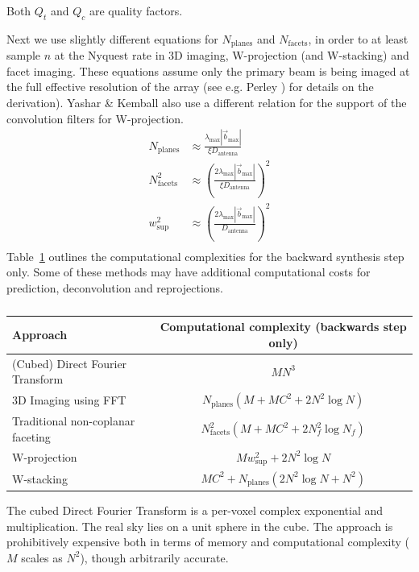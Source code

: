 Both $Q_t$ and $Q_c$ are quality factors.

Next we use slightly different equations for $N_\text{planes}$ and $N_\text{facets}$, in order to at least sample $n$ at the Nyquest rate in 3D imaging, W-projection (and W-stacking) and facet imaging. 
These equations assume only the primary beam is being imaged at the full effective resolution of the array (see e.g. Perley \cite[Lecture 19]{taylor1999synthesis}) for details on the derivation). 
Yashar \& Kemball \cite{yashar2009tdp} also use a different relation for the support of the convolution filters for W-projection.
\begin{equation}
 \begin{split}
  N_\text{planes} &\approx \frac{\lambda_{\text{max}}|\vec{b}_{\text{max}}|}{\xi D_{\text{antenna}}}\\
  N_\text{facets}^2 &\approx \left(\frac{2\lambda_{\text{max}}|\vec{b}_{\text{max}}|}{\xi D_{\text{antenna}}}\right)^2\\
  w_\text{sup}^2 &\approx \left(\frac{2\lambda_{\text{max}}|\vec{b}_{\text{max}}|}{D_{\text{antenna}}}\right)^2\\
 \end{split}
\end{equation}
Table~\ref{tbl_computational complexities} outlines the computational complexities for the backward synthesis step only. Some of these methods may have additional computational costs for prediction, deconvolution and reprojections.
\begin{table}[ht]
  \centering
  \begin{tabular}[c]{|p{7cm}|c|}
  \hline
  \textbf{Approach} & \textbf{Computational complexity (backwards step only)}\\
  \hline
  (Cubed) Direct Fourier Transform & $MN^3$\\
  \hline
  3D Imaging using FFT &$N_\text{planes}(M + MC^2 + 2N^2\log{N})$\\
  \hline
  Traditional non-coplanar faceting & $N_\text{facets}^2(M + MC^2 + 2N_f^2\log{N_f})$\\
  \hline
  W-projection & $Mw_\text{sup}^2+2N^2\log{N}$\\
  \hline
  W-stacking & $MC^2 + N_\text{planes}(2N^2\log{N} + N^2)$\\
  \hline
  \end{tabular}
  \caption[]{}
  \label{tbl_computational complexities}
\end{table}

The cubed Direct Fourier Transform is a per-voxel complex exponential and multiplication. The real sky lies on a unit sphere in the cube. The approach is prohibitively expensive both
in terms of memory and computational complexity ($M$ scales as $N^2$), though arbitrarily accurate. 

